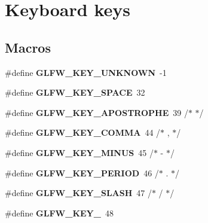 \hypertarget{group__keys}{}\section{Keyboard keys}
\label{group__keys}
\subsection*{Macros}
\begin{DoxyCompactItemize}
\item 
\mbox{\label{group__keys_ga99aacc875b6b27a072552631e13775c7}} 
\#define {\bfseries G\+L\+F\+W\+\_\+\+K\+E\+Y\+\_\+\+U\+N\+K\+N\+O\+WN}~-\/1
\item 
\mbox{\label{group__keys_gaddb2c23772b97fd7e26e8ee66f1ad014}} 
\#define {\bfseries G\+L\+F\+W\+\_\+\+K\+E\+Y\+\_\+\+S\+P\+A\+CE}~32
\item 
\mbox{\label{group__keys_ga6059b0b048ba6980b6107fffbd3b4b24}} 
\#define {\bfseries G\+L\+F\+W\+\_\+\+K\+E\+Y\+\_\+\+A\+P\+O\+S\+T\+R\+O\+P\+HE}~39  /$\ast$ \textquotesingle{} $\ast$/
\item 
\mbox{\label{group__keys_gab3d5d72e59d3055f494627b0a524926c}} 
\#define {\bfseries G\+L\+F\+W\+\_\+\+K\+E\+Y\+\_\+\+C\+O\+M\+MA}~44  /$\ast$ , $\ast$/
\item 
\mbox{\label{group__keys_gac556b360f7f6fca4b70ba0aecf313fd4}} 
\#define {\bfseries G\+L\+F\+W\+\_\+\+K\+E\+Y\+\_\+\+M\+I\+N\+US}~45  /$\ast$ -\/ $\ast$/
\item 
\mbox{\label{group__keys_ga37e296b650eab419fc474ff69033d927}} 
\#define {\bfseries G\+L\+F\+W\+\_\+\+K\+E\+Y\+\_\+\+P\+E\+R\+I\+OD}~46  /$\ast$ . $\ast$/
\item 
\mbox{\label{group__keys_gadf3d753b2d479148d711de34b83fd0db}} 
\#define {\bfseries G\+L\+F\+W\+\_\+\+K\+E\+Y\+\_\+\+S\+L\+A\+SH}~47  /$\ast$ / $\ast$/
\item 
\mbox{\label{group__keys_ga50391730e9d7112ad4fd42d0bd1597c1}} 
\#define {\bfseries G\+L\+F\+W\+\_\+\+K\+E\+Y\+\_}~48
\item 

\end{DoxyCompactItemize}
